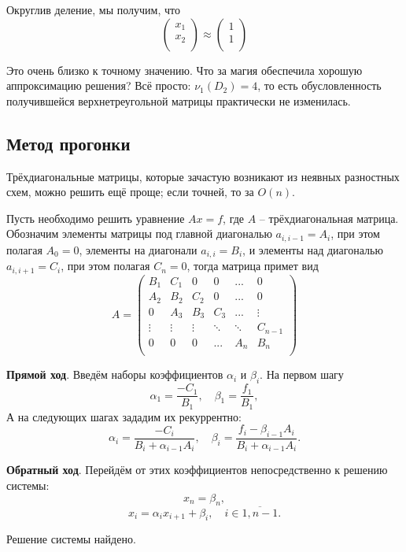 \documentclass{article}
\begin{document}
\begin{example}
	Округлив деление, мы получим, что
	\[
		\begin{pmatrix}
			x_1 \\
			x_2 \\
		\end{pmatrix}
		\approx
		\begin{pmatrix}
			1 \\
			1 \\
		\end{pmatrix}
	\]

	Это очень близко к точному значению. Что за магия обеспечила хорошую
	аппроксимацию решения? Всё просто: $\nu_1(D_2)=4$, то есть
	обусловленность получившейся верхнетреугольной матрицы практически не
	изменилась.
\end{example}

\subsection{Метод прогонки}
Трёхдиагональные матрицы, которые зачастую возникают из неявных разностных схем,
можно решить ещё проще; если точней, то за $O(n)$.

\begin{algorithm}
	Пусть необходимо решить уравнение $Ax=f$, где $A$ -- трёхдиагональная
	матрица. Обозначим элементы матрицы
	под главной диагональю $a_{i,i-1}=A_i$, при этом полагая $A_0=0$,
	элементы на диагонали $a_{i,i}=B_i$,
	и элементы над диагональю $a_{i,i+1}=C_i$, при этом полагая $C_n=0$,
	тогда матрица примет вид
	\[
		A=
		\begin{pmatrix}
			B_1	& C_1	& 0	& 0	& ...	& 0 \\
			A_2	& B_2	& C_2	& 0	& ...	& 0 \\
			0	& A_3	& B_3	& C_3	& ...	& \vdots\\
			\vdots	& \vdots& \vdots& \ddots& \ddots& C_{n-1} \\
			0	& 0	& 0	& ...	& A_n	& B_n\\
		\end{pmatrix}
	\]

	\textbf{Прямой ход}.
	Введём наборы коэффициентов $\alpha_i$ и $\beta_i$. На первом шагу
	\[\alpha_1=\frac{-C_1}{B_1},\quad \beta_1=\frac{f_1}{B_1},\]
	А на следующих шагах зададим их рекуррентно:
	\[\alpha_i=\frac{-C_i}{B_i+\alpha_{i-1}A_i},\quad
	\beta_i=\frac{f_i-\beta_{i-1}A_i}{B_i+\alpha_{i-1}A_i}.\]

	\textbf{Обратный ход}.
	Перейдём от этих коэффициентов непосредственно к решению системы:
	\[x_n=\beta_n,\]
	\[x_i=\alpha_i x_{i+1}+\beta_i,\quad i\in\overline{1,n-1}.\]

	Решение системы найдено.
\end{algorithm}
\end{document}
